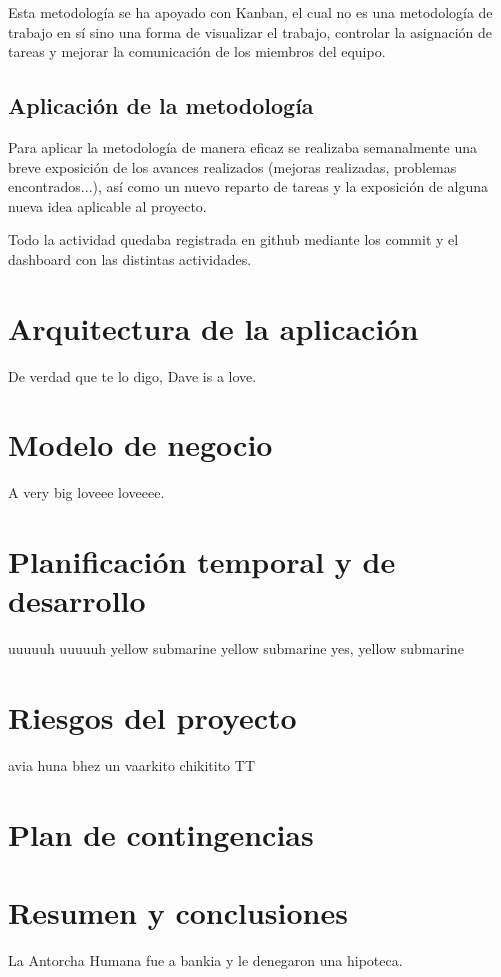 \documentclass[runningheads]{llncs}
\begin{document}
Esta metodología se ha apoyado con Kanban, el cual no es una metodología de trabajo en sí sino una forma de visualizar el trabajo, controlar la asignación de tareas y mejorar la comunicación de los miembros del equipo.

\subsection{Aplicación de la metodología}
Para aplicar la metodología de manera eficaz se realizaba semanalmente una breve exposición de los avances realizados (mejoras realizadas, problemas encontrados...), así como un nuevo reparto de tareas y la exposición de alguna nueva idea aplicable al proyecto.

Todo la actividad quedaba registrada en github mediante los commit y el dashboard con las distintas actividades.

\section{Arquitectura de la aplicación}
De verdad que te lo digo, Dave is a love.

\section{Modelo de negocio}
A very big loveee loveeee.

\section{Planificación temporal y de desarrollo}
uuuuuh uuuuuh yellow submarine yellow submarine yes, yellow submarine

\section{Riesgos del proyecto}
avia huna bhez un vaarkito chikitito TT

\section{Plan de contingencias}


\section{Resumen y conclusiones}
La Antorcha Humana fue a bankia y le denegaron una hipoteca.
\end{document}
